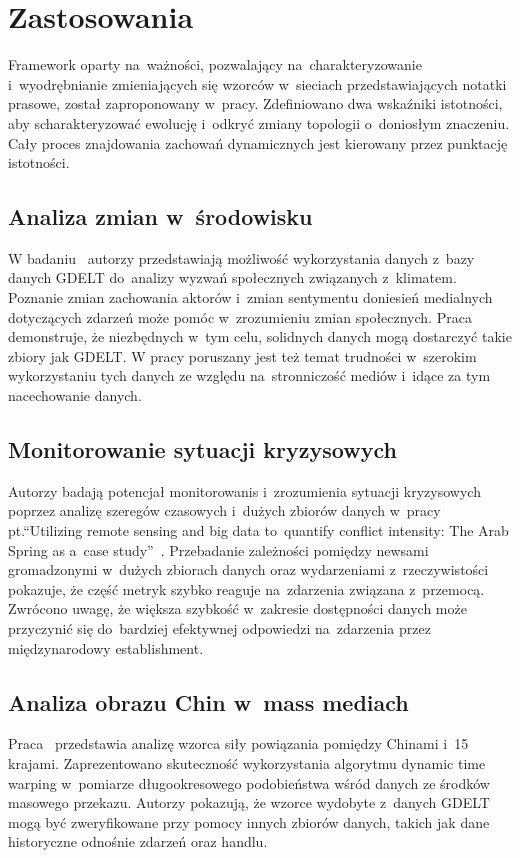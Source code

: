 \documentclass[11pt]{report}
\begin{document}
    \section{Zastosowania}\label{sec:zastosowania}
    Framework oparty na~ważności, pozwalający na~charakteryzowanie
    i~wyodrębnianie zmieniających się wzorców w~sieciach przedstawiających notatki prasowe, został zaproponowany
    w~pracy\cite{Yan2012}.
    Zdefiniowano dwa wskaźniki istotności, aby scharakteryzować ewolucję i~odkryć zmiany topologii o~doniosłym znaczeniu.
    Cały proces znajdowania zachowań dynamicznych jest kierowany przez punktację istotności.

    \subsection{Analiza zmian w~środowisku}
    W badaniu~\cite{Buckingham2020} autorzy przedstawiają możliwość wykorzystania danych z~bazy danych GDELT
    do~analizy wyzwań społecznych związanych z~klimatem.
    Poznanie zmian zachowania aktorów i~zmian sentymentu doniesień medialnych dotyczących zdarzeń może pomóc w~zrozumieniu zmian społecznych.
    Praca demonstruje, że niezbędnych w~tym celu, solidnych danych mogą dostarczyć takie zbiory jak GDELT\@.
    W pracy poruszany jest też temat trudności w~szerokim wykorzystaniu tych danych ze względu na~stronniczość mediów
    i~idące za tym nacechowanie danych.

    \subsection{Monitorowanie sytuacji kryzysowych}
    Autorzy badają potencjał monitorowanis i~zrozumienia sytuacji kryzysowych poprzez analizę szeregów czasowych i~dużych zbiorów danych
    w~pracy pt.\@ ``Utilizing remote sensing and big data to~quantify conflict intensity: The Arab Spring as a~case study''~\cite{Levin2018}.
    Przebadanie zależności pomiędzy newsami gromadzonymi w~dużych zbiorach danych oraz wydarzeniami z~rzeczywistości pokazuje,
    że część metryk szybko reaguje na~zdarzenia związana z~przemocą.
    Zwrócono uwagę, że większa szybkość w~zakresie dostępności danych może przyczynić się do~bardziej efektywnej
    odpowiedzi na~zdarzenia przez międzynarodowy establishment.

    \subsection{Analiza obrazu Chin w~mass mediach}
    Praca~\cite{Yuan2017} przedstawia analizę wzorca siły powiązania pomiędzy Chinami i~15 krajami.
    Zaprezentowano skuteczność wykorzystania algorytmu dynamic time warping w~pomiarze długookresowego podobieństwa
    wśród danych ze środków masowego przekazu.
    Autorzy pokazują, że wzorce wydobyte z~danych GDELT mogą być zweryfikowane przy pomocy innych zbiorów danych,
    takich jak dane historyczne odnośnie zdarzeń oraz handlu.
\end{document}
